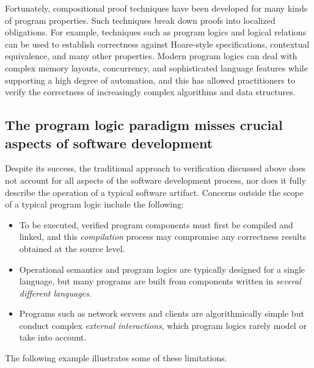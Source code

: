 \documentclass[acmsmall,screen,review,anonymous,nonacm]{acmart}
\begin{document}
Fortunately,
compositional proof techniques have been developed
for many kinds of program properties.
Such techniques break down proofs into
localized obligations.
For example,
techniques such as
program logics and logical relations
can be used to establish
correctness against Hoare-style specifications,
contextual equivalence,
and many other properties.
%
Modern program logics can deal with
complex memory layouts,
concurrency,
and sophisticated language features
while supporting
a high degree of automation,
and this has allowed practitioners
to verify the correctness of 
increasingly complex algorithms and data structures.



\subsection{The program logic paradigm %
  misses crucial aspects of software development}

Despite its success,
the traditional approach to verification
discussed above
does not account for all aspects of the software development process,
nor does it fully describe
the operation of a typical software artifact.
Concerns outside the scope of a typical program logic include the following:
\begin{itemize}
  \item To be executed,
    verified program components must first be compiled and linked,
    and this \emph{compilation} process may compromise
    any correctness results obtained at the source level.
  \item Operational semantics and program logics
    are typically designed for a single language, but
    many programs are built from components written
    in \emph{several different languages}.
  \item Programs such as network servers and clients
    are algorithmically simple
    but conduct complex \emph{external interactions},
    which program logics rarely model or take into account.
\end{itemize}
The following example illustrates some of these limitations.
\end{document}

